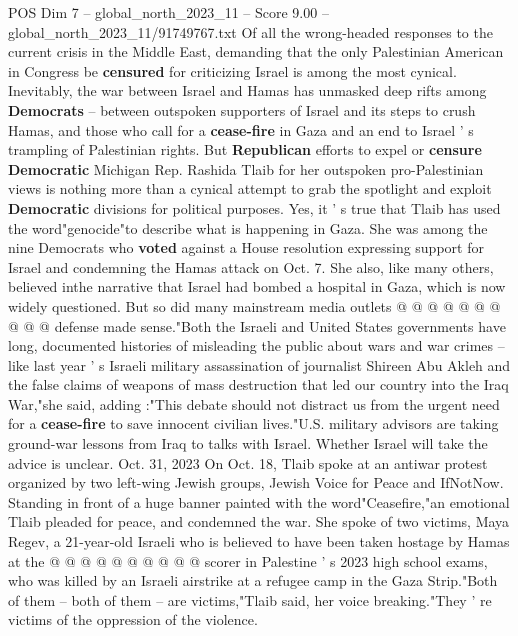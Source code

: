 \begin{textsample}{POS Dim 7 – global\_north\_2023\_11 – Score 9.00 – global\_north\_2023\_11/91749767.txt}  \label{ex:f7_pos_130}
Of all the wrong-headed responses to the current crisis in the Middle East, demanding that the only Palestinian American in Congress be \textbf{censured} for criticizing Israel is among the most cynical.
Inevitably, the war between Israel and Hamas has unmasked deep rifts among \textbf{Democrats} -- between outspoken supporters of Israel and its steps to crush Hamas, and those who call for a \textbf{cease-fire} in Gaza and an end to Israel ' s trampling of Palestinian rights.
But \textbf{Republican} efforts to expel or \textbf{censure} \textbf{Democratic} Michigan Rep.
Rashida Tlaib for her outspoken pro-Palestinian views is nothing more than a cynical attempt to grab the spotlight and exploit \textbf{Democratic} divisions for political purposes.
Yes, it ' s true that Tlaib has used the word"genocide"to describe what is happening in Gaza.
She was among the nine Democrats who \textbf{voted} against a House resolution expressing support for Israel and condemning the Hamas attack on Oct. 7.
She also, like many others, believed inthe narrative that Israel had bombed a hospital in Gaza, which is now widely questioned.
But so did many mainstream media outlets @ @ @ @ @ @ @ @ @ @ defense made sense."Both the Israeli and United States governments have long, documented histories of misleading the public about wars and war crimes -- like last year ' s Israeli military assassination of journalist Shireen Abu Akleh and the false claims of weapons of mass destruction that led our country into the Iraq War,"she said, adding :"This debate should not distract us from the urgent need for a \textbf{cease-fire} to save innocent civilian lives."U.S. military advisors are taking ground-war lessons from Iraq to talks with Israel.
Whether Israel will take the advice is unclear.
Oct. 31, 2023 On Oct. 18, Tlaib spoke at an antiwar protest organized by two left-wing Jewish groups, Jewish Voice for Peace and IfNotNow.
Standing in front of a huge banner painted with the word"Ceasefire,"an emotional Tlaib pleaded for peace, and condemned the war.
She spoke of two victims, Maya Regev, a 21-year-old Israeli who is believed to have been taken hostage by Hamas at the @ @ @ @ @ @ @ @ @ @ scorer in Palestine ' s 2023 high school exams, who was killed by an Israeli airstrike at a refugee camp in the Gaza Strip."Both of them -- both of them -- are victims,"Tlaib said, her voice breaking."They ' re victims of the oppression of the violence.

\end{textsample}
